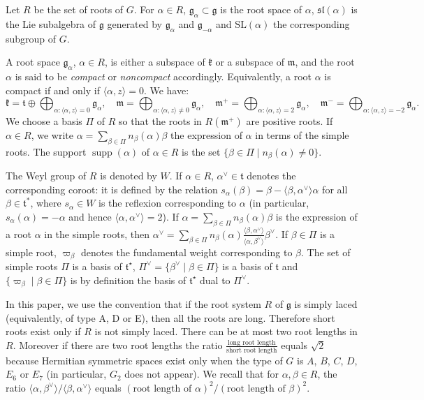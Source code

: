 \documentclass[10pt]{article}
\theoremstyle{definition}
\numberwithin{equation}{section}
\newcommand{\jepPubCoroot}{{\scriptscriptstyle\vee}}
\newcommand{\jepPubOplus}{\mathop{\textstyle\bigoplus}}
\begin{document}
Let $R$ be the set of roots of $G$. For $\alpha\in R$, $\mathfrak g_\alpha\subset\mathfrak g$ is the root space of $\alpha$, $\mathfrak{sl}(\alpha)$ is the Lie subalgebra of $\mathfrak g$ generated by $\mathfrak g_\alpha$ and $\mathfrak g_{-\alpha}$ and $\mathrm{SL}(\alpha)$ the corresponding subgroup of $G$.

A root space $\mathfrak g_\alpha$, $\alpha\in R$, is either a subspace of $\mathfrak k$ or a subspace of $\mathfrak m$, and the root $\alpha$ is said to be \emph{compact} or \emph{noncompact} accordingly. Equivalently, a root $\alpha$ is compact if and only if $\langle\alpha,z\rangle=0$. We have:
\[
\mathfrak k=\mathfrak t\oplus\jepPubOplus_{\alpha:\langle\alpha,z\rangle=0}\mathfrak g_\alpha,\quad
\mathfrak m=\jepPubOplus_{\alpha:\langle\alpha,z\rangle\neq0}\mathfrak g_\alpha,\quad
\mathfrak m^+=\jepPubOplus_{\alpha:\langle\alpha,z\rangle=2}\mathfrak g_\alpha,\quad
\mathfrak m^-=\jepPubOplus_{\alpha:\langle\alpha,z\rangle=-2}\mathfrak g_\alpha.
\]
We choose a basis $\Pi$ of $R$ so that the roots in $R(\mathfrak m^+)$ are positive roots. If $\alpha\in R$, we write $\alpha=\sum_{\beta\in\Pi}n_\beta(\alpha)\beta$ the expression of $\alpha$ in terms of the simple roots. The support $\operatorname{supp}(\alpha)$ of $\alpha\in R$ is the set $\{\beta\in\Pi\mid n_\beta(\alpha)\neq0\}$.

The Weyl group of $R$ is denoted by $W$. If $\alpha\in R$, $\alpha^\jepPubCoroot\in\mathfrak t$ denotes the corresponding coroot: it is defined by the relation $s_\alpha(\beta)=\beta-\langle\beta,\alpha^\jepPubCoroot\rangle\alpha$ for all $\beta\in\mathfrak t^*$, where $s_\alpha\in W$ is the reflexion corresponding to $\alpha$ (in particular, $s_\alpha(\alpha)=-\alpha$ and hence $\langle\alpha,\alpha^\jepPubCoroot\rangle=2$). If $\alpha=\sum_{\beta\in\Pi}n_\beta(\alpha)\beta$ is the expression of a root $\alpha$ in the simple roots, then $\alpha^\jepPubCoroot=\sum_{\beta\in\Pi}n_\beta(\alpha)\frac{\langle\beta,\alpha^\jepPubCoroot\rangle}{\langle\alpha,\beta^\jepPubCoroot\rangle}\beta^\jepPubCoroot$. If $\beta\in\Pi$ is a simple root, $\varpi_\beta$ denotes the fundamental weight corresponding to $\beta$. The set of simple roots $\Pi$ is a basis of $\mathfrak t^{\star}$, $\Pi^\jepPubCoroot=\{\beta^\jepPubCoroot\mid\beta\in\Pi\}$ is a basis of $\mathfrak t$ and $\{\varpi_\beta\mid\beta\in\Pi\}$ is by definition the basis of $\mathfrak t^{\star}$ dual to $\Pi^\jepPubCoroot$.

In this paper, we use the convention that if the root system $R$ of $\mathfrak g$ is simply laced (equivalently, of type A, D or E), then all the roots are long. Therefore short roots exist only if $R$ is not simply laced. There can be at most two root lengths in $R$. Moreover if there are two root lengths the ratio $\frac{\text{long root length}}{\text{short root length}}$ equals $\sqrt2$ because Hermitian symmetric spaces exist only when the type of $G$ is $A$, $B$, $C$, $D$, $E_6$ or $E_7$ (in particular, $G_2$ does not appear). We recall that for $\alpha,\beta\in R$, the ratio $\langle\alpha,\beta^\jepPubCoroot\rangle/\langle\beta,\alpha^\jepPubCoroot\rangle$ equals $(\text{root length of }\alpha)^2/(\text{root length of }\beta)^2$.
\end{document}
